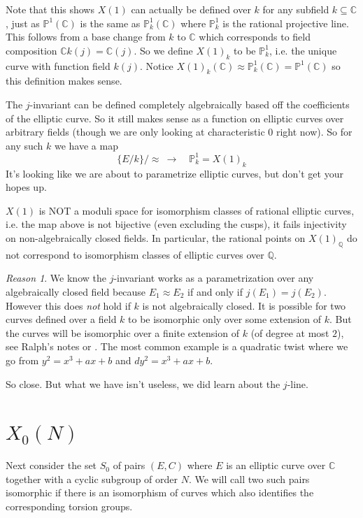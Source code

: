 \documentclass[11pt]{article}
\newcommand{\BB}[1]{\mathbb{#1}} %
\newcommand{\CC}{\BB{C}}
\newcommand{\QQ}{\BB{Q}}
\newcommand{\PP}{\BB{P}}
\theoremstyle{plain}
\theoremstyle{remark}
\newtheorem*{reason}{Reason}
\begin{document}
Note that this shows $X(1)$ can actually be defined over $k$ for any subfield $k\subseteq\CC$, just as $\PP^1(\CC)$ is the same as $\PP^1_{k}(\CC)$ where $\PP^1_k$ is the rational projective line. This follows from a base change from $k$ to $\CC$ which corresponds to field composition $\CC k(j) = \CC(j)$. So we define $X(1)_{k}$ to be $\PP^1_{k}$, i.e. the unique curve with function field $k(j)$. Notice $X(1)_k(\CC) \approx \PP^1_k(\CC) = \PP^1(\CC)$ so this definition makes sense.

The $j$-invariant can be defined completely algebraically based off the coefficients of the elliptic curve. So it still makes sense as a function on elliptic curves over arbitrary fields (though we are only looking at characteristic $0$ right now). So for any such $k$ we have a map
$$
\{E/k\}/\approx ~\to \quad\PP^1_k = X(1)_k
$$
It's looking like we are about to parametrize elliptic curves, but don't get your hopes up.

\begin{fact}
	$X(1)$ is NOT a moduli space for isomorphism classes of rational elliptic curves, i.e. the map above is not bijective (even excluding the cusps), it fails injectivity on non-algebraically closed fields. In particular, the rational points on $X(1)_\QQ$ do not correspond to isomorphism classes of elliptic curves over $\QQ$.
\end{fact}
\begin{reason}
	We know the $j$-invariant works as a parametrization over any algebraically closed field because $E_1\approx E_2$ if and only if $j(E_1) = j(E_2)$. However this does \emph{not} hold if $k$ is not algebraically closed. It is possible for two curves defined over a field $k$ to be isomorphic only over some extension of $k$. But the curves will be isomorphic over a finite extension of $k$ (of degree at most $2$), see Ralph's notes or \cite[Remark II.2.2]{milne}. The most common example is a quadratic twist where we go from $y^2 = x^3 + ax + b$ and $dy^2 = x^3 + ax + b$.
\end{reason}

So close. But what we have isn't useless, we did learn about the $j$-line.


\section{$X_0(N)$}

Next consider the set $S_0$ of pairs $(E,C)$ where $E$ is an elliptic curve over $\CC$ together with a cyclic subgroup of order $N$. We will call two such pairs isomorphic if there is an isomorphism of curves which also identifies the corresponding torsion groups.
\end{document}
